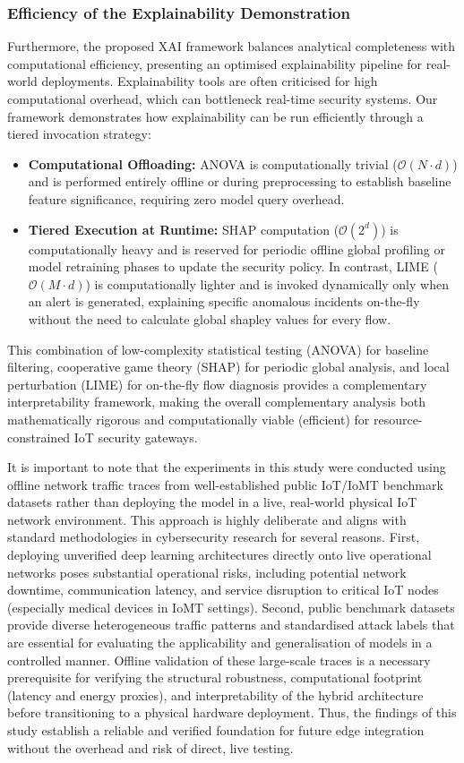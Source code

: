 \documentclass[a4paper,fleqn]{cas-sc}
\begin{document}
\subsubsection{Efficiency of the Explainability Demonstration}
Furthermore, the proposed XAI framework balances analytical completeness with computational efficiency, presenting an optimised explainability pipeline for real-world deployments. Explainability tools are often criticised for high computational overhead, which can bottleneck real-time security systems. Our framework demonstrates how explainability can be run efficiently through a tiered invocation strategy:
\begin{itemize}
    \item \textbf{Computational Offloading:} ANOVA is computationally trivial ($\mathcal{O}(N \cdot d)$) and is performed entirely offline or during preprocessing to establish baseline feature significance, requiring zero model query overhead.
    \item \textbf{Tiered Execution at Runtime:} SHAP computation ($\mathcal{O}(2^d)$) is computationally heavy and is reserved for periodic offline global profiling or model retraining phases to update the security policy. In contrast, LIME ($\mathcal{O}(M \cdot d)$) is computationally lighter and is invoked dynamically only when an alert is generated, explaining specific anomalous incidents on-the-fly without the need to calculate global shapley values for every flow.
\end{itemize}
This combination of low-complexity statistical testing (ANOVA) for baseline filtering, cooperative game theory (SHAP) for periodic global analysis, and local perturbation (LIME) for on-the-fly flow diagnosis provides a complementary interpretability framework, making the overall complementary analysis both mathematically rigorous and computationally viable (efficient) for resource-constrained IoT security gateways.

It is important to note that the experiments in this study were conducted using offline network traffic traces from well-established public IoT/IoMT benchmark datasets rather than deploying the model in a live, real-world physical IoT network environment. This approach is highly deliberate and aligns with standard methodologies in cybersecurity research for several reasons. First, deploying unverified deep learning architectures directly onto live operational networks poses substantial operational risks, including potential network downtime, communication latency, and service disruption to critical IoT nodes (especially medical devices in IoMT settings). Second, public benchmark datasets provide diverse heterogeneous traffic patterns and standardised attack labels that are essential for evaluating the applicability and generalisation of models in a controlled manner. Offline validation of these large-scale traces is a necessary prerequisite for verifying the structural robustness, computational footprint (latency and energy proxies), and interpretability of the hybrid architecture before transitioning to a physical hardware deployment. Thus, the findings of this study establish a reliable and verified foundation for future edge integration without the overhead and risk of direct, live testing.
\end{document}
